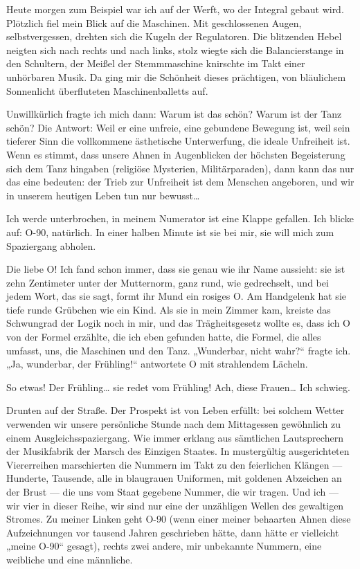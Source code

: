 Heute morgen zum Beispiel war ich auf der Werft, wo der Integral
gebaut wird. Plötzlich fiel mein Blick auf die Maschinen. Mit
geschlossenen Augen, selbstvergessen, drehten sich die Kugeln der
Regulatoren. Die blitzenden Hebel neigten sich nach rechts und nach
links, stolz wiegte sich die Balancierstange in den Schultern, der
Meißel der Stemmmaschine knirschte im Takt einer unhörbaren Musik.
Da ging mir die Schönheit dieses prächtigen, von bläulichem
Sonnenlicht überfluteten Maschinenballetts auf.

Unwillkürlich fragte ich mich dann: Warum ist das schön? Warum ist
der Tanz schön? Die Antwort: Weil er eine unfreie, eine gebundene
Bewegung ist, weil sein tieferer Sinn die vollkommene ästhetische
Unterwerfung, die ideale Unfreiheit ist. Wenn es stimmt, dass
unsere Ahnen in Augenblicken der höchsten Begeisterung sich dem
Tanz hingaben (religiöse Mysterien, Militärparaden), dann kann das
nur das eine bedeuten: der Trieb zur Unfreiheit ist dem Menschen
angeboren, und wir in unserem heutigen Leben tun nur bewusst\ldots{}

Ich werde unterbrochen, in meinem Numerator ist eine Klappe
gefallen. Ich blicke auf: O-90, natürlich. In einer halben Minute
ist sie bei mir, sie will mich zum Spaziergang abholen.

Die liebe O! Ich fand schon immer, dass sie genau wie ihr Name
aussieht: sie ist zehn Zentimeter unter der Mutternorm, ganz rund,
wie gedrechselt, und bei jedem Wort, das sie sagt, formt ihr Mund
ein rosiges O. Am Handgelenk hat sie tiefe runde Grübchen wie ein
Kind. Als sie in mein Zimmer kam, kreiste das Schwungrad der Logik
noch in mir, und das Trägheitsgesetz wollte es, dass ich O von der
Formel erzählte, die ich eben gefunden hatte, die Formel, die alles
umfasst, uns, die Maschinen und den Tanz. „Wunderbar, nicht wahr?“
fragte ich. „Ja, wunderbar, der Frühling!“ antwortete O mit
strahlendem Lächeln.

So etwas! Der Frühling\ldots{} sie redet vom Frühling! Ach, diese
Frauen\ldots{} Ich schwieg.

Drunten auf der Straße. Der Prospekt ist von Leben erfüllt: bei
solchem Wetter verwenden wir unsere persönliche Stunde nach dem
Mittagessen gewöhnlich zu einem Ausgleichsspaziergang. Wie immer
erklang aus
sämtlichen Lautsprechern der Musikfabrik der Marsch des Einzigen
Staates. In mustergültig ausgerichteten Viererreihen marschierten
die Nummern im Takt zu den feierlichen Klängen — Hunderte,
Tausende, alle in blaugrauen Uniformen, mit goldenen Abzeichen an
der Brust — die uns vom Staat gegebene Nummer, die wir tragen. Und
ich — wir vier in dieser Reihe, wir sind nur eine der unzähligen
Wellen des gewaltigen Stromes. Zu meiner Linken geht O-90 (wenn
einer meiner behaarten Ahnen diese Aufzeichnungen vor tausend
Jahren geschrieben hätte, dann hätte er vielleicht „meine O-90“
gesagt), rechts zwei andere, mir unbekannte Nummern, eine weibliche
und eine männliche.


